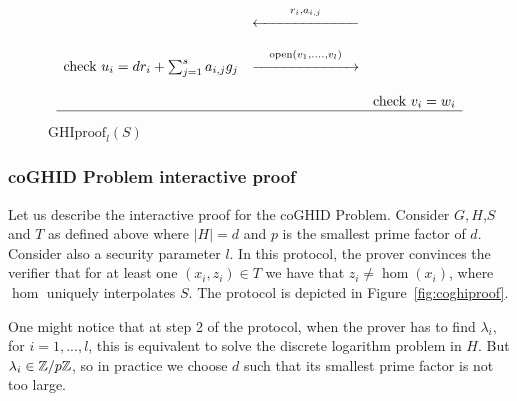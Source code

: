 \begin{figure}[!h]
\[\begin{array}{ccc}
                                                  &&\\
                                                  & \overset{r_i,a_{i,j}}{\xleftarrow{\hspace*{70pt}}}           &                                   \\ 
                                                  &&\\
             \mbox{check } u_i = dr_i + \sum_{j=1}^{s}{a_{i,j}g_{j}}& \overset{\mathrm{open}(v_1,....,v_l)}{\xrightarrow{\hspace*{70pt}}}  &        \\
                                                  &&\\
                                                  &                                    & \mbox{check } v_i = w_i           \\
        \hline
        \end{array}
    \]
    \caption{$\mathrm{GHIproof}_{l}(S)$}
    \label{fig:ghiproof}
\end{figure}

\subsubsection{coGHID Problem interactive proof}
Let us describe the interactive proof for the coGHID Problem.
Consider $G,H$,$S$ and $T$ as defined above where $|H| = d$ and $p$ is the smallest prime factor of $d$. Consider also a security parameter $l$. 
In this protocol, the prover convinces the verifier that for at least one $(x_i,z_i) \in T$
we have that $z_i \neq \hom(x_i)$, where $\hom$ uniquely interpolates $S$.
The protocol is depicted in Figure~\ref{fig:coghiproof}. 

One might notice that at step 2 of the protocol, when the prover has to find $\lambda_i$, for $i = 1,...,l$, this is equivalent to solve the discrete logarithm problem in $H$.
But $\lambda_i \in \mathbb{Z}/p\mathbb{Z}$, so in practice we choose $d$ such that its smallest prime factor is not too large.

